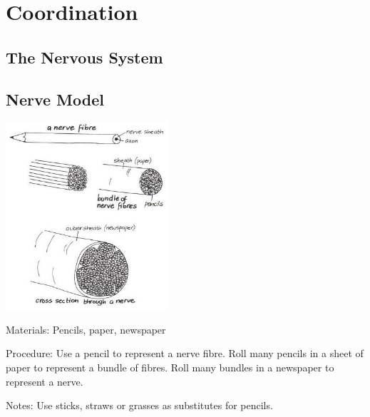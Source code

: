 \section{Coordination}

\begin{multicols}{2}


\section*{The Nervous System}


\subsection{Nerve Model} %

\begin{center}
\includegraphics[width=0.45\textwidth]{./img/vso/nerve-model.jpg}
\end{center}

\begin{description*}
\item[Materials:]{Pencils, paper, newspaper}
\item[Procedure:]{Use a pencil to represent a nerve fibre. Roll many pencils in a sheet of paper to represent a bundle of fibres. Roll many bundles in a newspaper to represent a nerve.}
\item[Notes:]{Use sticks, straws or grasses as substitutes for pencils.}
\end{description*}


\end{multicols}
